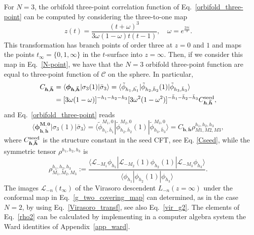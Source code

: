 \documentclass[a4paper,11pt]{article}
\begin{document}
For $N=3$, the orbifold three-point correlation 
function of Eq.~\eqref{orbifold_three-point} can be computed 
by considering the three-to-one map~\cite{Collier}
\begin{equation}\label{g_two_covering_map}
 z(t) =\frac{(t+\omega)^3}{3\omega(1-\omega)t(t-1)},\quad \omega=e^{\frac{2\pi i}{3}}.
\end{equation}
This transformation has branch points of order three at 
$z=0$ and $1$ and maps the points $t_{\infty}=\{0, 1, \infty\}$ in the $t$-surface into $z=\infty$. 
Then, if we consider this map in Eq.~\eqref{N-point}, we have that the $N=3$ orbifold three-point 
function are equal to three-point function of $\mathcal{C}$ on the sphere. In particular,
\begin{align}\label{C_3_0}
 C_{\boldsymbol{h}, \boldsymbol{\bar{h}}}&=
 \langle \boldsymbol{\phi}_{\boldsymbol{h}, \boldsymbol{\bar{h}}}|\sigma_3(1)|\bar{\sigma}_3\rangle
  =\langle \tilde{\phi}_{h_1, \bar{h_1}}|\tilde{\phi}_{h_2, \bar{h}_2}(1)|\tilde{\phi}_{h_3, \bar{h}_3}\rangle \nonumber \\
 &=[3\omega(1-\omega)]^{-h_1-h_2-h_3}[3\omega^2(1-\omega^2)]^{-\bar{h}_1-\bar{h}_2-\bar{h}_3}C_{\boldsymbol{h}, \boldsymbol{\bar{h}}}^{{\rm seed}},
\end{align}
and Eq.~\eqref{orbifold_three-point} reads
\begin{equation}\label{C_3_X}
 \langle \boldsymbol{\phi}^{\boldsymbol{M}, \boldsymbol{0}}_{\boldsymbol{h}, \boldsymbol{\bar{h}}}|\sigma_{3}(1)|\bar{\sigma}_{3}\rangle =\langle \tilde{\phi}_{h_1,\bar{h}_1}^{M_1,0}|\tilde{\phi}_{h_2,\bar{h}_2}^{M_2,0}(1)|\tilde{\phi}_{h_3,\bar{h}_3}^{M_3,0}\rangle
 =C_{\boldsymbol{h}, \boldsymbol{\bar{h}}} \rho_{M1,M2,M3}^{h_1,h_2,h_3},
\end{equation}
where $C_{\boldsymbol{h},\boldsymbol{\bar{h}}}^{{\rm seed}}$ is the structure constant in the seed CFT, see  Eq. \eqref{Cseed}, while the symmetric tensor $\rho^{h_1,h_2,h_3}$ is 
\begin{equation}
\label{rho2}
 \rho^{h_1,h_2,h_3}_{M_1,M_2,M_3}:=
 \frac{\langle \mathcal{L}_{-M_1}\phi_{h_1}|\mathcal{L}_{-M_2}(1)\phi_{h_2}(1)|\mathcal{L}_{-M_3}\phi_{h_3}\rangle}
 { \langle \phi_{h_1}|\phi_{h_2}(1)|\phi_{h_3}\rangle}.
\end{equation}
The images $\mathcal{L}_{-n}(t_{\infty})$ of the Virasoro descendent $L_{-n}(z=\infty)$ 
under the conformal map in Eq.~\eqref{g_two_covering_map} can determined, as in the 
case $N=2$, by using Eq.~\eqref{Virasoro_transf}, see also Eq.~\eqref{vir_g2}.
The elements of Eq.~\eqref{rho2} can be calculated by implementing in a computer 
algebra system the Ward identities of Appendix~\ref{app_ward}.
\end{document}

